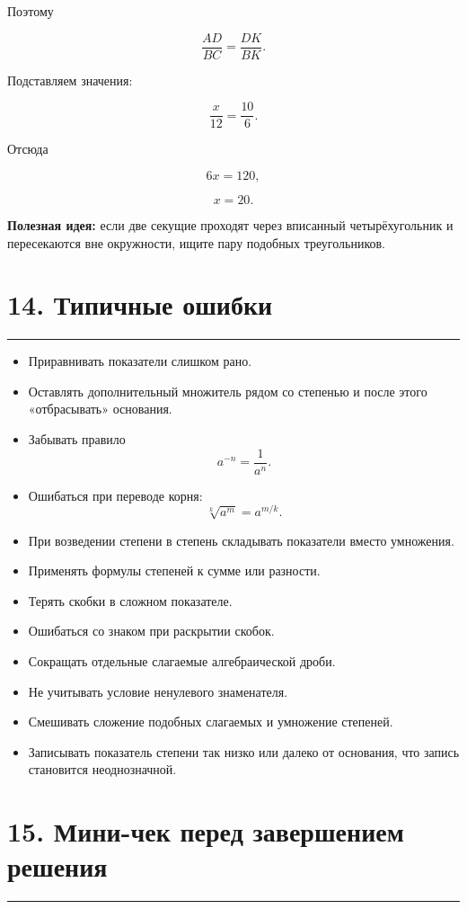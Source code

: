 \documentclass[a4paper,12pt]{article}
\newcommand{\sectionline}{\par\vspace{0.15em}\noindent\textcolor{accent}{\rule{\linewidth}{0.7pt}}\par\vspace{0.2em}}
\newcommand{\key}[1]{\textcolor{darkaccent}{\textbf{#1}}}
\begin{document}
Поэтому

\[
\frac{AD}{BC}
=
\frac{DK}{BK}.
\]

Подставляем значения:

\[
\frac{x}{12}
=
\frac{10}{6}.
\]

Отсюда

\[
6x=120,
\]

\[
\boxed{x=20}.
\]

\key{Полезная идея:}
если две секущие проходят через вписанный четырёхугольник и пересекаются вне окружности, ищите пару подобных треугольников.


\section*{14. Типичные ошибки}
\sectionline

\begin{itemize}
  \item Приравнивать показатели слишком рано.
  \item Оставлять дополнительный множитель рядом со степенью и после этого «отбрасывать» основания.
  \item Забывать правило
  \[
  a^{-n}=\frac1{a^n}.
  \]
  \item Ошибаться при переводе корня:
  \[
  \sqrt[k]{a^m}=a^{m/k}.
  \]
  \item При возведении степени в степень складывать показатели вместо умножения.
  \item Применять формулы степеней к сумме или разности.
  \item Терять скобки в сложном показателе.
  \item Ошибаться со знаком при раскрытии скобок.
  \item Сокращать отдельные слагаемые алгебраической дроби.
  \item Не учитывать условие ненулевого знаменателя.
  \item Смешивать сложение подобных слагаемых и умножение степеней.
  \item Записывать показатель степени так низко или далеко от основания, что запись становится неоднозначной.
\end{itemize}


\section*{15. Мини-чек перед завершением решения}
\sectionline
\end{document}
